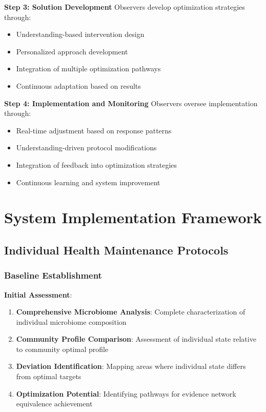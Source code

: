 \documentclass[12pt,a4paper]{article}
\begin{document}
\textbf{Step 3: Solution Development}
Observers develop optimization strategies through:
\begin{itemize}
\item Understanding-based intervention design
\item Personalized approach development
\item Integration of multiple optimization pathways
\item Continuous adaptation based on results
\end{itemize}

\textbf{Step 4: Implementation and Monitoring}
Observers oversee implementation through:
\begin{itemize}
\item Real-time adjustment based on response patterns
\item Understanding-driven protocol modifications
\item Integration of feedback into optimization strategies
\item Continuous learning and system improvement
\end{itemize}

\section{System Implementation Framework}

\subsection{Individual Health Maintenance Protocols}

\subsubsection{Baseline Establishment}

\textbf{Initial Assessment}:
\begin{enumerate}
\item \textbf{Comprehensive Microbiome Analysis}: Complete characterization of individual microbiome composition
\item \textbf{Community Profile Comparison}: Assessment of individual state relative to community optimal profile
\item \textbf{Deviation Identification}: Mapping areas where individual state differs from optimal targets
\item \textbf{Optimization Potential}: Identifying pathways for evidence network equivalence achievement
\end{enumerate}
\end{document}
